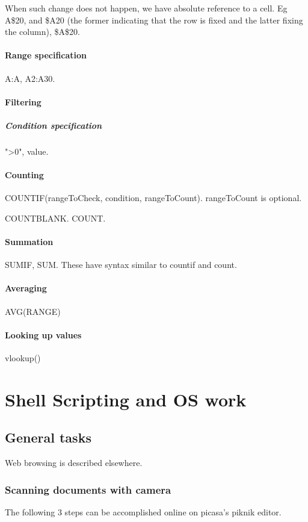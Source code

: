 \documentclass[oneside, article]{memoir}
\begin{document}
When such change does not happen, we have absolute reference to a cell. Eg A\$20, and \$A20 (the former indicating that the row is fixed and the latter fixing the column), \$A\$20.

\subsection{Range specification}
A:A, A2:A30.

\subsection{Filtering}


\subsubsection{Condition specification}
">0", value.

\subsection{Counting}
COUNTIF(rangeToCheck, condition, rangeToCount). rangeToCount is optional.

COUNTBLANK. COUNT.

\subsection{Summation}
SUMIF, SUM. These have syntax similar to countif and count.


\subsection{Averaging}
AVG(RANGE)

\subsection{Looking up values}
vlookup()

\part{Shell Scripting and OS work}
\chapter{General tasks}
Web browsing is described elsewhere.

\section{Scanning documents with camera}
The following 3 steps can be accomplished online on picasa's piknik editor.
\end{document}
